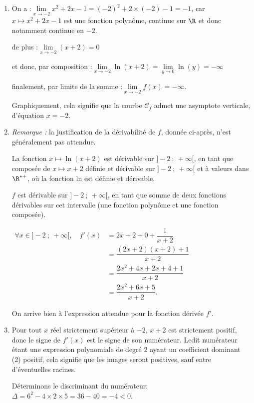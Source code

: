 \begin{enumerate}
\item On a :\quad $\lim\limits_{x \to -2} x^2 + 2x - 1 = (-2)^2 + 2\times (-2) - 1 = -1$, \quad car $x\longmapsto x^2 + 2x - 1$ est une fonction polynôme, continue sur $\R$ et donc notamment continue en $-2$.

de plus :\quad $\lim\limits_{x \to -2} (x + 2) = 0$

et donc, par composition :\quad $\lim\limits_{x \to -2}\ln(x+2) = \lim\limits_{y \to 0} \ln(y) = -\infty$

finalement, par limite de la somme :\quad $\lim\limits_{x \to -2}f(x) = -\infty$.

Graphiquement, cela signifie que la courbe $\mathcal{C}_f$ admet une asymptote verticale, d'équation $x = -2$.

\item \emph{Remarque :} la justification de la dérivabilité de $f$, donnée ci-après, n'est généralement pas attendue.

\smallskip

La fonction $x \longmapsto \ln(x+2)$ est dérivable sur $]-2~;~+\infty[$, en tant que composée de $x \longmapsto x+2$ définie et dérivable sur $]-2~;~+\infty[$ et à valeurs dans $\R^{*+}$, où la fonction ln est définie et dérivable.

$f$ est dérivable sur $]-2~;~+\infty[$, en tant que somme de deux fonctions dérivables sur cet intervalle (une fonction polynôme et une fonction composée).

$\begin{aligned} \forall x \in ]-2~;~+\infty[,\quad f'(x)&=2x + 2 + 0 + \dfrac{1}{x+2}\\
&=\dfrac{(2x + 2)(x+2) + 1}{x+2}\\
&=\dfrac{2x^2 + 4x + 2x + 4 + 1}{x+2}\\
&=\dfrac{2 x^{2} + 6x + 5}{x + 2}.\end{aligned}$

On arrive bien à l'expression attendue pour la fonction dérivée $f'$.
\item Pour tout $x$ réel strictement supérieur à $-2$, $x + 2$ est strictement positif, donc le signe de $f'(x)$ est le signe de son numérateur. Ledit numérateur étant une expression polynomiale de degré 2 ayant un coefficient dominant (2) positif, cela signifie que les images seront positives, sauf entre d'éventuelles racines.

Déterminons le discriminant du numérateur: \quad $\Delta = 6^2 - 4\times 2 \times 5 = 36 - 40 = -4 <0$.


\end{enumerate}

